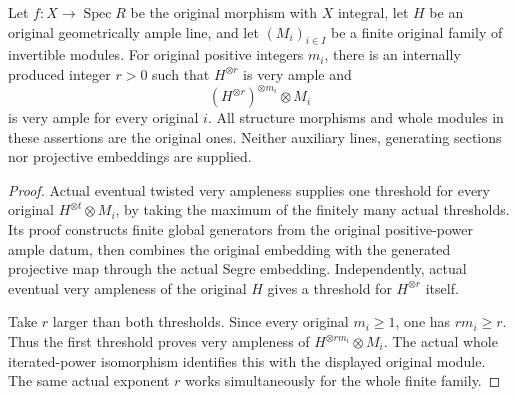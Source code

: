 \begin{theorem}
\label{thm:kn-nadel-auxiliary-positive-powers}
\leanok
{}
Let $f:X\to\operatorname{Spec}R$ be the original morphism with $X$
integral, let $H$ be an original geometrically ample line, and let
$(M_i)_{i\in I}$ be a finite original family of invertible modules.
For original positive integers $m_i$, there is an internally produced
integer $r>0$ such that $H^{\otimes r}$ is very ample and
\[
 (H^{\otimes r})^{\otimes m_i}\otimes M_i
\]
is very ample for every original $i$. All structure morphisms and whole
modules in these assertions are the original ones. Neither auxiliary
lines, generating sections nor projective embeddings are supplied.
\end{theorem}
\begin{proof}
Actual eventual twisted very ampleness supplies one threshold for every
original $H^{\otimes t}\otimes M_i$, by taking the maximum of the finitely
many actual thresholds. Its proof constructs finite global generators
from the original positive-power ample datum, then combines the original
embedding with the generated projective map through the actual Segre
embedding. Independently, actual eventual very ampleness of the original
$H$ gives a threshold for $H^{\otimes r}$ itself.

Take $r$ larger than both thresholds. Since every original $m_i\geq1$,
one has $r m_i\geq r$. Thus the first threshold proves very ampleness of
$H^{\otimes r m_i}\otimes M_i$. The actual whole iterated-power
isomorphism identifies this with the displayed original module. The same
actual exponent $r$ works simultaneously for the whole finite family.
\end{proof}


